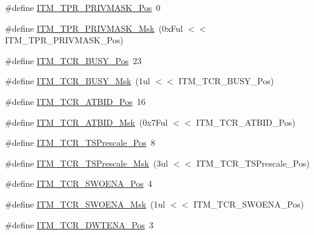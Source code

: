 \begin{DoxyCompactItemize}
\item 
\#define \mbox{\hyperlink{group___c_m_s_i_s___c_m3___i_t_m_ga7abe5e590d1611599df87a1884a352e8}{I\+T\+M\+\_\+\+T\+P\+R\+\_\+\+P\+R\+I\+V\+M\+A\+S\+K\+\_\+\+Pos}}~0
\item 
\#define \mbox{\hyperlink{group___c_m_s_i_s___c_m3___i_t_m_ga168e089d882df325a387aab3a802a46b}{I\+T\+M\+\_\+\+T\+P\+R\+\_\+\+P\+R\+I\+V\+M\+A\+S\+K\+\_\+\+Msk}}~(0x\+Ful $<$$<$ I\+T\+M\+\_\+\+T\+P\+R\+\_\+\+P\+R\+I\+V\+M\+A\+S\+K\+\_\+\+Pos)
\item 
\#define \mbox{\hyperlink{group___c_m_s_i_s___c_m3___i_t_m_ga9174ad4a36052c377cef4e6aba2ed484}{I\+T\+M\+\_\+\+T\+C\+R\+\_\+\+B\+U\+S\+Y\+\_\+\+Pos}}~23
\item 
\#define \mbox{\hyperlink{group___c_m_s_i_s___c_m3___i_t_m_ga43ad7cf33de12f2ef3a412d4f354c60f}{I\+T\+M\+\_\+\+T\+C\+R\+\_\+\+B\+U\+S\+Y\+\_\+\+Msk}}~(1ul $<$$<$ I\+T\+M\+\_\+\+T\+C\+R\+\_\+\+B\+U\+S\+Y\+\_\+\+Pos)
\item 
\#define \mbox{\hyperlink{group___c_m_s_i_s___c_m3___i_t_m_gad5a179af7ad1f2b8958e50907186529b}{I\+T\+M\+\_\+\+T\+C\+R\+\_\+\+A\+T\+B\+I\+D\+\_\+\+Pos}}~16
\item 
\#define \mbox{\hyperlink{group___c_m_s_i_s___c_m3___i_t_m_ga491d8bddbe6c0523ff10ef6d2846f0f2}{I\+T\+M\+\_\+\+T\+C\+R\+\_\+\+A\+T\+B\+I\+D\+\_\+\+Msk}}~(0x7\+Ful $<$$<$ I\+T\+M\+\_\+\+T\+C\+R\+\_\+\+A\+T\+B\+I\+D\+\_\+\+Pos)
\item 
\#define \mbox{\hyperlink{group___c_m_s_i_s___c_m3___i_t_m_gad7bc9ee1732032c6e0de035f0978e473}{I\+T\+M\+\_\+\+T\+C\+R\+\_\+\+T\+S\+Prescale\+\_\+\+Pos}}~8
\item 
\#define \mbox{\hyperlink{group___c_m_s_i_s___c_m3___i_t_m_ga7a723f71bfb0204c264d8dbe8cc7ae52}{I\+T\+M\+\_\+\+T\+C\+R\+\_\+\+T\+S\+Prescale\+\_\+\+Msk}}~(3ul $<$$<$ I\+T\+M\+\_\+\+T\+C\+R\+\_\+\+T\+S\+Prescale\+\_\+\+Pos)
\item 
\#define \mbox{\hyperlink{group___c_m_s_i_s___c_m3___i_t_m_ga7a380f0c8078f6560051406583ecd6a5}{I\+T\+M\+\_\+\+T\+C\+R\+\_\+\+S\+W\+O\+E\+N\+A\+\_\+\+Pos}}~4
\item 
\#define \mbox{\hyperlink{group___c_m_s_i_s___c_m3___i_t_m_ga97476cb65bab16a328b35f81fd02010a}{I\+T\+M\+\_\+\+T\+C\+R\+\_\+\+S\+W\+O\+E\+N\+A\+\_\+\+Msk}}~(1ul $<$$<$ I\+T\+M\+\_\+\+T\+C\+R\+\_\+\+S\+W\+O\+E\+N\+A\+\_\+\+Pos)
\item 
\#define \mbox{\hyperlink{group___c_m_s_i_s___c_m3___i_t_m_ga30e83ebb33aa766070fe3d1f27ae820e}{I\+T\+M\+\_\+\+T\+C\+R\+\_\+\+D\+W\+T\+E\+N\+A\+\_\+\+Pos}}~3
$$
\end{DoxyCompactItemize}
